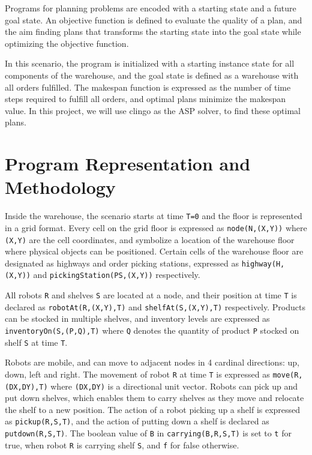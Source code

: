 \documentclass[letterpaper]{article}
\newcommand{\ct}[1]{\texttt{#1}}
\begin{document}
Programs for planning problems are encoded with a starting state and a future goal state. An objective function is defined to evaluate the quality of a plan, and the aim finding plans that transforms the starting state into the goal state while optimizing the objective function.

In this scenario, the program is initialized with a starting instance state for all components of the warehouse, and the goal state is defined as a warehouse with all orders fulfilled. The makespan function is expressed as the number of time steps required to fulfill all orders, and optimal plans minimize the makespan value. In this project, we will use clingo as the ASP solver, to find these optimal plans.


\section{Program Representation and Methodology}

Inside the warehouse, the scenario starts at time \ct{T=0} and the floor is represented in a grid format. Every cell on the grid floor is expressed as \ct{node(N,(X,Y))} where \ct{(X,Y)} are the cell coordinates, and symbolize a location of the warehouse floor where physical objects can be positioned. Certain cells of the warehouse floor are designated as highways and order picking stations, expressed as \ct{highway(H,(X,Y))} and \ct{pickingStation(PS,(X,Y))} respectively.

All robots \ct{R} and shelves \ct{S} are located at a node, and their position at time \ct{T} is declared as \ct{robotAt(R,(X,Y),T)} and \ct{shelfAt(S,(X,Y),T)} respectively. Products can be stocked in multiple shelves, and inventory levels are expressed as \ct{inventoryOn(S,(P,Q),T)} where \ct{Q} denotes the quantity of product \ct{P} stocked on shelf \ct{S} at time \ct{T}.

Robots are mobile, and can move to adjacent nodes in 4 cardinal directions: up, down, left and right. The movement of robot \ct{R} at time \ct{T} is expressed as \ct{move(R,(DX,DY),T)} where \ct{(DX,DY)} is a directional unit vector. Robots can pick up and put down shelves, which enables them to carry shelves as they move and relocate the shelf to a new position. The action of a robot picking up a shelf is expressed as \ct{pickup(R,S,T)}, and the action of putting down a shelf is declared as \ct{putdown(R,S,T)}. The boolean value of \ct{B} in \ct{carrying(B,R,S,T)} is set to \ct{t} for true, when robot \ct{R} is carrying shelf \ct{S}, and \ct{f} for false otherwise.
\end{document}
